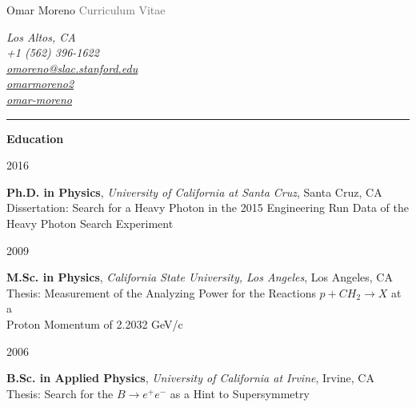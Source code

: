 \documentclass[11pt]{article}
\newcommand{\cvsection}[1] {
    \noindent
    \textcolor{indigodye}{\rule{.15\textwidth}{.1in} \hspace{0.01 \textwidth} \textbf{\Large{#1}}} \newline 
}
\newcommand{\educationentry}[5] { 
    \noindent
    \begin{minipage}[t]{0.15\textwidth} \begin{flushright} #1 \end{flushright} \end{minipage} \hspace{0.01\textwidth}
    \begin{minipage}[t]{0.84\textwidth} 
        \textbf{#2}, \emph{#3}, #4 \newline 
        #5 \newline
    \end{minipage}
}
\begin{document}
    
    \noindent
    \begin{minipage}[c]{0.5\textwidth}
        \begin{flushleft}
            \Huge{Omar Moreno} \newline
            \Large{\textcolor{dimgray}{Curriculum Vitae}}
        \end{flushleft}
    \end{minipage}
    \begin{minipage}[c]{0.50\textwidth}
        \begin{flushright}
            \color{dimgray} \em
            Los Altos, CA           \\
            \faMobilePhone \hspace{1pt} +1 (562) 396-1622       \\
            \faEnvelope \hspace{1pt} \href{mailto:omoreno@slac.stanford.edu}{omoreno@slac.stanford.edu}          \\
            \faLinkedin \hspace{1pt} \href{https://www.linkedin.com/in/omarmoreno2}{omarmoreno2} \\
            \faGithub \hspace{1pt} \href{https://github.com/omar-moreno}{omar-moreno}            \\
        \end{flushright}
    \end{minipage}

    \cvsection{Education}
        \educationentry{2016}
                       {Ph.D. in Physics}
                       {University of California at Santa Cruz}
                       {Santa Cruz, CA}
                       {Dissertation: Search for a Heavy Photon in the 2015 Engineering Run Data of the Heavy Photon Search Experiment}
        \educationentry{2009}
                       {M.Sc. in Physics}
                       {California State University, Los Angeles}
                       {Los Angeles, CA}
                       {Thesis: Measurement of the Analyzing Power for the Reactions $p + CH_{2}
                       \rightarrow X$ at a \\ Proton Momentum of 2.2032 GeV/c}
        \educationentry{2006}
                       {B.Sc. in Applied Physics}
                       {University of California at Irvine}
                       {Irvine, CA}
                       {Thesis: Search for the $B\rightarrow e^+e^-$ as a Hint to Supersymmetry}
\end{document}
